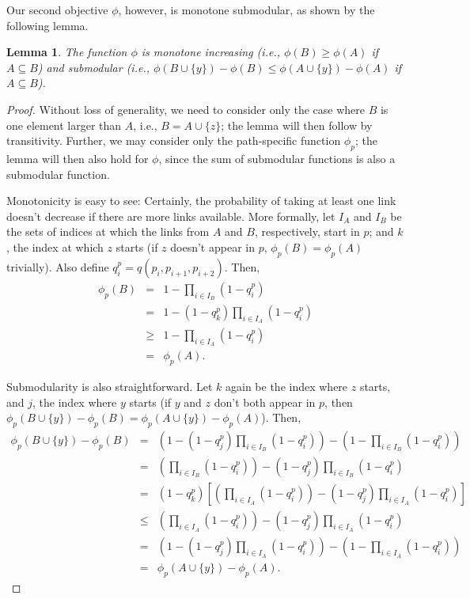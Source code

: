 \documentclass[11pt,letterpaper]{article}
\newtheorem{lemma}{Lemma}
\begin{document}
Our second objective $\phi$, however, is monotone submodular, as shown by the following lemma.

\begin{lemma}
\label{thm:monotonicity}
The function $\phi$ is monotone increasing (i.e., $\phi(B) \geq \phi(A)$ if $A \subseteq B$) and submodular (i.e., $\phi(B \cup \{y\}) - \phi(B) \leq \phi(A \cup \{y\}) - \phi(A)$ if $A \subseteq B$).
\end{lemma}

\begin{proof}[Proof]
Without loss of generality, we need to consider only the case where $B$ is one element larger than $A$, i.e., $B = A \cup \{z\}$; the lemma will then follow by transitivity. Further, we may consider only the path\hyp specific function $\phi_p$; the lemma will then also hold for $\phi$, since the sum of submodular functions is also a submodular function.

Monotonicity is easy to see: Certainly, the probability of taking at least one link doesn't decrease if there are more links available. More formally, let $I_A$ and $I_B$ be the sets of indices at which the links from $A$ and $B$, respectively, start in $p$; and $k$, the index at which $z$ starts (if $z$ doesn't appear in $p$, $\phi_p(B)=\phi_p(A)$ trivially).
Also define $q^p_i = q(p_i,p_{i+1},p_{i+2})$.
Then,
\begin{eqnarray}
\phi_p(B)  &=& 1 - \prod_{i \in I_B} \left( 1 - q^p_i \right) \\
                      &=& 1 - (1 - q^p_k) \prod_{i \in I_A} \left( 1 - q^p_i \right) \\
                      &\geq& 1 - \prod_{i \in I_A} \left( 1 - q^p_i \right) \\
                      &=& \phi_p(A).
\end{eqnarray}

Submodularity is also straightforward. Let $k$ again be the index where $z$ starts, and $j$, the index where $y$ starts (if $y$ and $z$ don't both appear in $p$, then $\phi_p(B \cup \{y\}) - \phi_p(B) = \phi_p(A \cup \{y\}) - \phi_p(A)$). Then,
\begin{eqnarray}
\phi_p(B \cup \{y\}) - \phi_p(B) 
  &=& \left(1 - (1 - q^p_j) \prod_{i \in I_B} \left( 1 - q^p_i \right)\right)
    - \left(1 - \prod_{i \in I_B} \left( 1 - q^p_i \right)\right) \\
  &=& \left(\prod_{i \in I_B} \left( 1 - q^p_i \right)\right) - (1 - q^p_j) \prod_{i \in I_B} \left( 1 - q^p_i \right) \\
  &=& (1 - q^p_k) \left[\left(\prod_{i \in I_A} \left( 1 - q^p_i \right)\right) - (1 - q^p_j) \prod_{i \in I_A} \left( 1 - q^p_i \right)\right] \\
  &\leq& \left(\prod_{i \in I_A} \left( 1 - q^p_i \right)\right) - (1 - q^p_j) \prod_{i \in I_A} \left( 1 - q^p_i \right) \\
  &=& \left(1 - (1 - q^p_j) \prod_{i \in I_A} \left( 1 - q^p_i \right)\right)
    - \left(1 - \prod_{i \in I_A} \left( 1 - q^p_i \right)\right) \\
  &=& \phi_p(A \cup \{y\}) - \phi_p(A).
\end{eqnarray}
\end{proof}
\end{document}
